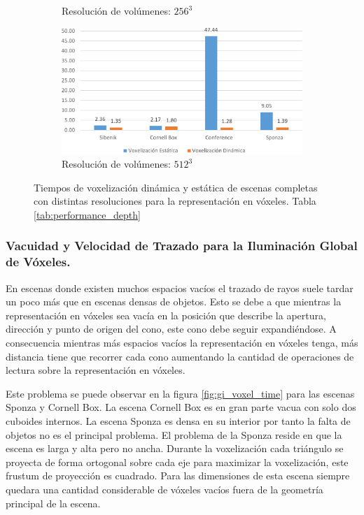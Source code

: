 \begin{figure}[H]
\begin{subfigure}{.49\textwidth}
		\caption*{Resolución de volúmenes: $256^3$}
	\end{subfigure}
	\begin{subfigure}{.49\textwidth}
		\centering
		\includegraphics[width=\linewidth]{media/voxelzation_512_cropped.pdf}	
		\caption*{Resolución de volúmenes: $512^3$}
	\end{subfigure}
	\caption{Tiempos de voxelización dinámica y estática de escenas completas con distintas resoluciones para la representación en vóxeles. Tabla \ref{tab:performance_depth}}
	\label{fig:voxelization_times}
\end{figure}

\subsubsection{Vacuidad y Velocidad de Trazado para la Iluminación Global de Vóxeles.}
\label{subsubsec:emptyness}

En escenas donde existen muchos espacios vacíos el trazado de rayos suele tardar un poco más que en escenas densas de objetos. Esto se debe a que mientras la representación en vóxeles sea vacía en la posición que describe la apertura, dirección y punto de origen del cono, este cono debe seguir expandiéndose. A consecuencia mientras más espacios vacíos la representación en vóxeles tenga, más distancia tiene que recorrer cada cono aumentando la cantidad de operaciones de lectura sobre la representación en vóxeles.

Este problema se puede observar en la figura \ref{fig:gi_voxel_time} para las escenas Sponza y Cornell Box. La escena Cornell Box es en gran parte vacua con solo dos cuboides internos. La escena Sponza es densa en su interior por tanto la falta de objetos no es el principal problema. El problema de la Sponza reside en que la escena es larga y alta pero no ancha. Durante la voxelización cada triángulo se proyecta de forma ortogonal sobre cada eje para maximizar la voxelización, este frustum de proyección es cuadrado. Para las dimensiones de esta escena siempre quedara una cantidad considerable de vóxeles vacíos fuera de la geometría principal de la escena. 


